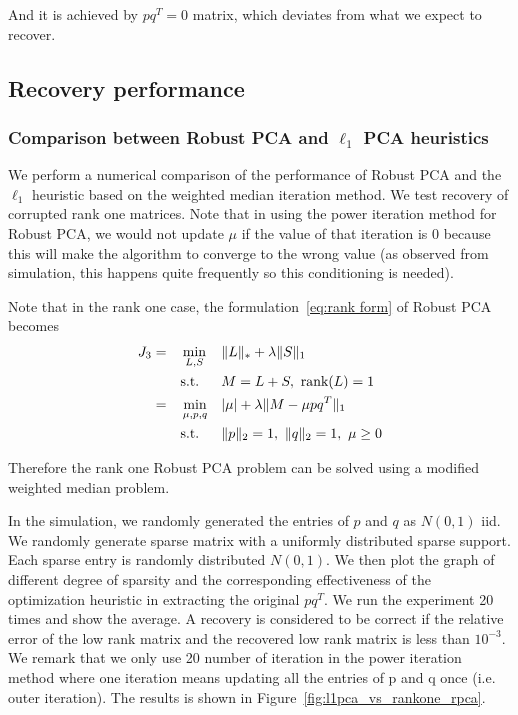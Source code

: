 And it is achieved by $pq^{T}=0$ matrix, which deviates from what
we expect to recover.


\subsection{Recovery performance}


\subsubsection{Comparison between Robust PCA and $\ell_{1}$ PCA heuristics}

We perform a numerical comparison of the performance of Robust PCA and the $\ell_{1}$ heuristic based on the weighted median iteration method. We test recovery of corrupted rank one matrices. Note that in using the power iteration method for Robust PCA, we would not update $\mu$ if the value of that iteration is 0 because this will make the algorithm to converge to the wrong value (as observed from simulation, this happens quite frequently so this conditioning is needed).

Note that in the rank one case, the formulation~\eqref{eq:rank form} of Robust PCA becomes
\begin{alignat}{3}
J_{3}
&= &&\min_{L, S}  && \|L\|_{*} + \lambda \|S\|_{1} \notag \\
&&&\text{s.t.} && M=L+S, \ \text{rank}(L) = 1 \notag \\
& = && \min_{\mu, p, q} && |\mu| + \lambda \|M - \mu p q^T\|_{1} \label{eq:rank_form_rk1} \\
&&& \text{s.t.} && \|p\|_2 = 1, \ \|q\|_2 = 1, \ \mu \ge 0 \notag
\end{alignat}

Therefore the rank one Robust PCA problem can be solved using a modified weighted median problem.




In the simulation, we randomly generated the entries of $p$ and $q$ as $N(0,1)$ iid. We randomly generate sparse matrix with a uniformly distributed sparse support. Each sparse entry is randomly distributed $N(0,1)$. We then plot the graph of different degree of sparsity and the corresponding effectiveness of the optimization heuristic in extracting the original $pq^{T}$. We run the experiment 20 times and show the average. A recovery is considered to be correct if the relative error of the low rank matrix and the recovered low rank matrix is less than $10^{-3}$. We remark that we only use 20 number of iteration in the power iteration method where one iteration means updating all the entries of p and q once (i.e. outer iteration). The results is shown in Figure~\ref{fig:l1pca_vs_rankone_rpca}.

